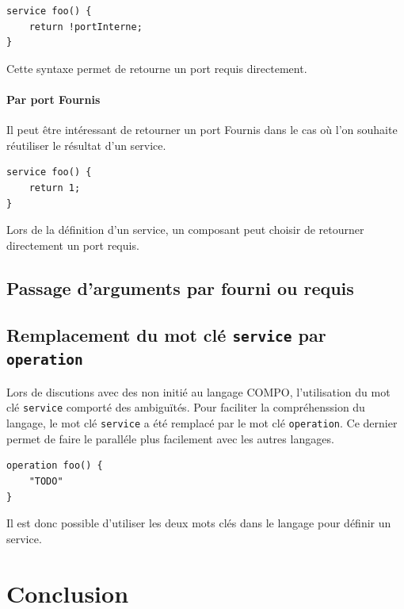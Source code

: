 \documentclass[11pt,a4paper,openany,oneside]{book}
\begin{document}
\begin{lstlisting}[language=COMPO, frame=single, caption=Syntaxe de retour d'un port requis en COMPO]
service foo() {
    return !portInterne;
}
\end{lstlisting}

Cette syntaxe permet de retourne un port requis directement.


\subsubsection{Par port Fournis}
Il peut être intéressant de retourner un port Fournis dans le cas où l'on souhaite réutiliser le résultat d'un service.


\begin{lstlisting}[language=COMPO, frame=single, caption=Syntaxe de retour d'un port founis en COMPO]
service foo() {
    return 1;
}
\end{lstlisting}

Lors de la définition d'un service, un composant peut choisir de retourner directement un port requis.


\section{Passage d'arguments par fourni ou requis}


\section{Remplacement du mot clé \texttt{service} par \texttt{operation} }

Lors de discutions avec des non initié au langage COMPO, l'utilisation du mot clé \texttt{service} comporté des ambiguïtés. Pour faciliter la compréhenssion du langage, le mot clé \texttt{service} a été remplacé par le mot clé \texttt{operation}. Ce dernier permet de faire le paralléle plus facilement avec les autres langages.

\begin{lstlisting}[language=COMPO, frame=single, caption=Syntaxe d'une opération en COMPO]
operation foo() {
    "TODO"
}
\end{lstlisting}

Il est donc possible d'utiliser les deux mots clés dans le langage pour définir un service.

\chapter{Conclusion}
\end{document}
